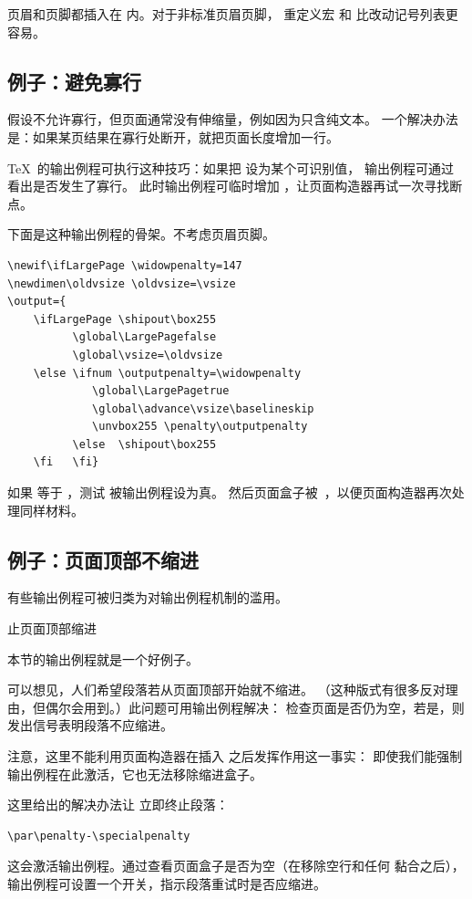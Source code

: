 \documentclass[a4paper]{rapport3}
\def\howto#1\par{}
\begin{document}
页眉和页脚都插入在  内。对于非标准页眉页脚，
重定义宏  和  比改动记号列表更容易。

\subsection{例子：避免寡行}

假设不允许寡行，但页面通常没有伸缩量，例如因为只含纯文本。
一个解决办法是：如果某页结果在寡行处断开，就把页面长度增加一行。

\TeX\ 的输出例程可执行这种技巧：如果把  设为某个可识别值，
输出例程可通过  看出是否发生了寡行。
此时输出例程可临时增加 ，让页面构造器再试一次寻找断点。

下面是这种输出例程的骨架。不考虑页眉页脚。
\begin{verbatim}
\newif\ifLargePage \widowpenalty=147
\newdimen\oldvsize \oldvsize=\vsize
\output={
    \ifLargePage \shipout\box255 
          \global\LargePagefalse
          \global\vsize=\oldvsize
    \else \ifnum \outputpenalty=\widowpenalty
             \global\LargePagetrue
             \global\advance\vsize\baselineskip
             \unvbox255 \penalty\outputpenalty
          \else  \shipout\box255
    \fi   \fi}
\end{verbatim}
如果  等于 ，测试  被输出例程设为真。
然后页面盒子被 $\,$，以便页面构造器再次处理同样材料。

\subsection{例子：页面顶部不缩进}

有些输出例程可被归类为对输出例程机制的滥用。
\howto 防止页面顶部缩进\par
本节的输出例程就是一个好例子。

可以想见，人们希望段落若从页面顶部开始就不缩进。
（这种版式有很多反对理由，但偶尔会用到。）此问题可用输出例程解决：
检查页面是否仍为空，若是，则发出信号表明段落不应缩进。

注意，这里不能利用页面构造器在插入  之后发挥作用这一事实：
即使我们能强制输出例程在此激活，它也无法移除缩进盒子。

这里给出的解决办法让  立即终止段落：
\begin{verbatim}
\par\penalty-\specialpenalty
\end{verbatim}
这会激活输出例程。通过查看页面盒子是否为空（在移除空行和任何  黏合之后），
输出例程可设置一个开关，指示段落重试时是否应缩进。
\end{document}
